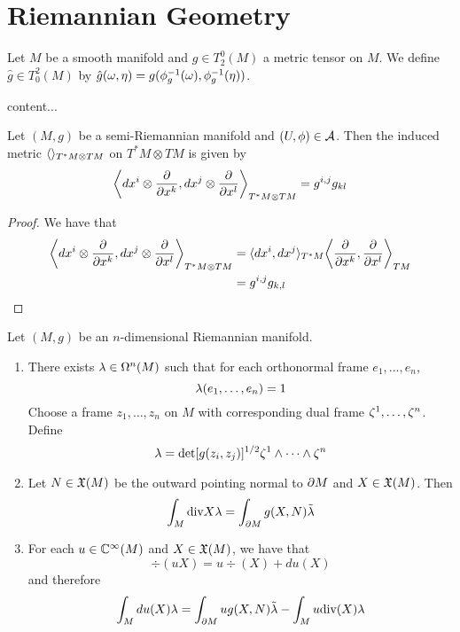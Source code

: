 \documentclass{book}
\begin{document}
	\newpage
	\chapter{Riemannian Geometry}

	\begin{defn}
		Let $M$ be a smooth manifold and $g \in T^0_2(M)$ a metric tensor on $M$. We define $\hat{g} \in T^2_0(M)$ by $\hat{g}(\omega, \eta) = g(\phi_g^{-1}(\omega), \phi_g^{-1}(\eta))$. 
	\end{defn}

	\begin{ex}
		content...
	\end{ex}

	\begin{ex}
		Let $(M, g)$ be a semi-Riemannian manifold and $(U, \phi) \in \mathcal{A}$. Then the induced metric $\langle \rangle_{T^*M \otimes TM}$ on $T^*M \otimes TM$ is given by 
		$$\bigg \langle dx^i \otimes \frac{\partial }{\partial x^k}, dx^j \otimes \frac{\partial}{\partial x^l} \bigg \rangle_{T^*M \otimes TM} = g^{i,j}g_{kl}$$
	\end{ex}

	\begin{proof}
		We have that 
		\begin{align*}
			\bigg \langle dx^i \otimes \frac{\partial }{\partial x^k}, dx^j \otimes \frac{\partial}{\partial x^l} \bigg \rangle_{T^*M \otimes TM}
			& = \langle dx^i , dx^j \rangle_{T^*M} \bigg \langle \frac{\partial }{\partial x^k}, \frac{\partial }{\partial x^l} \bigg \rangle_{TM} \\
			& = g^{i,j}g_{k,l}
		\end{align*}
	\end{proof}


\begin{ex}
	Let $(M, g)$ be an $n$-dimensional Riemannian manifold.
	\begin{enumerate}
		\item There exists $\lambda \in \Omega^n(M)$ such that for each orthonormal frame $e_1, \ldots, e_n$, 
		$$\lambda(e_1, \ldots, e_n) = 1$$
		 Choose a frame $z_1, \ldots, z_n$ on $M$ with corresponding dual frame $\zeta^1, \ldots, \zeta^n$. Define $$\lambda = \det [g(z_i, z_j)]^{1/2} \zeta^1 \wedge \cdots \wedge \zeta^n$$
		\item Let $N \in \mathfrak{X}(M)$ be the outward pointing normal to $\partial M$ and $X \in \mathfrak{X}(M)$. Then 
		$$\int_M \text{div} X \lambda = \int_{\partial M} g(X, N) \tilde{\lambda}$$
		\item For each $u \in \mathbb{C}^{\infty}(M)$ and $X \in \mathfrak{X}(M)$, we have that 
		$$\div(uX) = u \div(X) + du(X)$$ 
		and therefore
		$$\int_M du(X) \lambda = \int_{\partial M} u g(X, N) \tilde{\lambda} - \int_{M} u \text{div}(X) \lambda$$
	\end{enumerate}
\end{ex}
\end{document}
